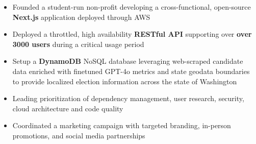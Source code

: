 \begin{itemize}
    \item Founded a student-run non-profit developing a cross-functional, open-source \textbf{Next.js} application deployed through AWS
    \item Deployed a throttled, high availability \textbf{RESTful API} supporting over \textbf{over 3000 users} during a critical usage period
    \item Setup a \textbf{DynamoDB} NoSQL database leveraging web-scraped candidate data enriched with finetuned GPT-4o metrics and state geodata boundaries to provide localized election information across the state of Washington
    \item Leading prioritization of dependency management, user research, security, cloud architecture and code quality
    \item Coordinated a marketing campaign with targeted branding, in-person promotions, and social media partnerships
\end{itemize}